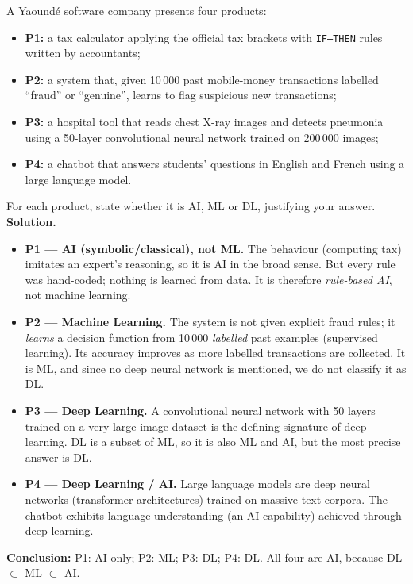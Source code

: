 \documentclass[11pt]{article}
\begin{document}
\begin{exoresolu}
A Yaound\'e software company presents four products:
\begin{itemize}
\item \textbf{P1:} a tax calculator applying the official tax brackets with \texttt{IF--THEN} rules written by accountants;
\item \textbf{P2:} a system that, given 10\,000 past mobile-money transactions labelled ``fraud'' or ``genuine'', learns to flag suspicious new transactions;
\item \textbf{P3:} a hospital tool that reads chest X-ray images and detects pneumonia using a 50-layer convolutional neural network trained on 200\,000 images;
\item \textbf{P4:} a chatbot that answers students' questions in English and French using a large language model.
\end{itemize}
For each product, state whether it is AI, ML or DL, justifying your answer.
\tcblower
\textbf{Solution.}
\begin{itemize}
\item \textbf{P1 — AI (symbolic/classical), not ML.} The behaviour (computing tax) imitates an expert's reasoning, so it is AI in the broad sense. But every rule was hand-coded; nothing is learned from data. It is therefore \emph{rule-based AI}, not machine learning.
\item \textbf{P2 — Machine Learning.} The system is not given explicit fraud rules; it \emph{learns} a decision function from 10\,000 \emph{labelled} past examples (supervised learning). Its accuracy improves as more labelled transactions are collected. It is ML, and since no deep neural network is mentioned, we do not classify it as DL.
\item \textbf{P3 — Deep Learning.} A convolutional neural network with 50 layers trained on a very large image dataset is the defining signature of deep learning. DL is a subset of ML, so it is also ML and AI, but the most precise answer is DL.
\item \textbf{P4 — Deep Learning / AI.} Large language models are deep neural networks (transformer architectures) trained on massive text corpora. The chatbot exhibits language understanding (an AI capability) achieved through deep learning.
\end{itemize}
\textbf{Conclusion:} P1: AI only; P2: ML; P3: DL; P4: DL. All four are AI, because DL $\subset$ ML $\subset$ AI.
\end{exoresolu}
\end{document}
